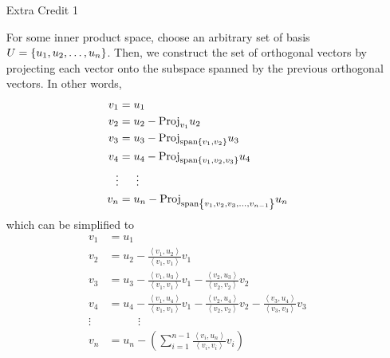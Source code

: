 \documentclass{amsart}
\theoremstyle{definition}
\theoremstyle{definition}
\DeclareMathOperator{\1}{\mathbbm{1}}
\DeclareMathOperator{\Span}{span}
\newcommand{\condset}[4]{\left\{ #1  : \: #2 #3 #4 \right\}}
\newcommand{\innerproduct}[2]{\left\langle #1,#2 \right\rangle}
\newcommand{\proj}[2]{\mathrm{Proj}_{#1} {#2} }
\begin{document}
	\begin{enumerate}
		
		\item[Extra Credit 1]
%			
		
		
		For some inner product space, choose an arbitrary set of basis $U = \set{u_1,u_2,\dots,u_n}$. Then, we construct the set of orthogonal vectors by projecting each vector onto the subspace spanned by the previous orthogonal vectors. In other words,
		\begin{align*}
			v_1 &= u_1 \\
			v_2 &= u_2 - \proj{v_1}{u_2} \\
			v_3 &= u_3 - \proj{\Span\set{v_1,v_2}}{u_3} \\
			v_4 &= u_4 - \proj{\Span\set{v_1,v_2,v_3}}{u_4} \\
			\vdots & \phantom{==} \vdots \\
			v_n &= u_n - \proj{\Span\set{v_1,v_2,v_3,\dots,v_{n-1}}}{u_n}
		\end{align*}
		which can be simplified to
		\begin{align*}
			v_1 &= u_1 \\
			v_2 &= u_2 - \frac{\innerproduct{v_1}{u_2}}{\innerproduct{v_1}{v_1}} v_1 \\
			v_3 &= u_3 - \frac{\innerproduct{v_1}{u_3}}{\innerproduct{v_1}{v_1}} v_1 - \frac{\innerproduct{v_2}{u_3}}{\innerproduct{v_2}{v_2}} v_2 \\
			v_4 &= u_4 - \frac{\innerproduct{v_1}{u_4}}{\innerproduct{v_1}{v_1}} v_1 - \frac{\innerproduct{v_2}{u_4}}{\innerproduct{v_2}{v_2}} v_2 - \frac{\innerproduct{v_3}{u_4}}{\innerproduct{v_3}{v_3}} v_3 \\
			\vdots & \phantom{==} \vdots \\
			v_n &= u_n - \left( \sum_{i=1}^{n-1} \frac{ \innerproduct{v_i}{u_n} }{\innerproduct{v_i}{v_i}} v_i \right)
		\end{align*}
		

\end{enumerate}
\end{document}

